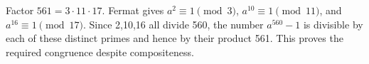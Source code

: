 Factor $561=3\cdot11\cdot17$. Fermat gives $a^2\equiv1\pmod3$, $a^{10}\equiv1\pmod{11}$, and $a^{16}\equiv1\pmod{17}$. Since 2,10,16 all divide 560, the number $a^{560}-1$ is divisible by each of these distinct primes and hence by their product 561. This proves the required congruence despite compositeness.
